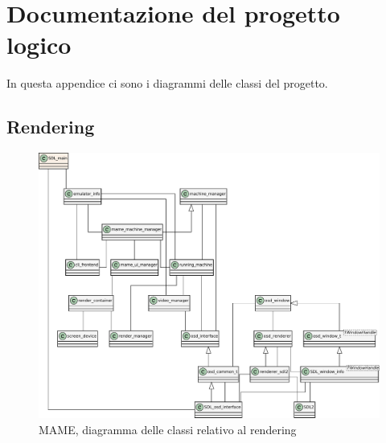 \chapter{Documentazione del progetto logico}
In questa appendice ci sono i diagrammi delle classi del progetto.

\section{Rendering}

\begin{figure}[H]
	\includegraphics[width=\linewidth]{immagini/mame_render_class_diagram}
	\caption{MAME, diagramma delle classi relativo al rendering}
	\label{fig:mame_render_class_diagram}
\end{figure}